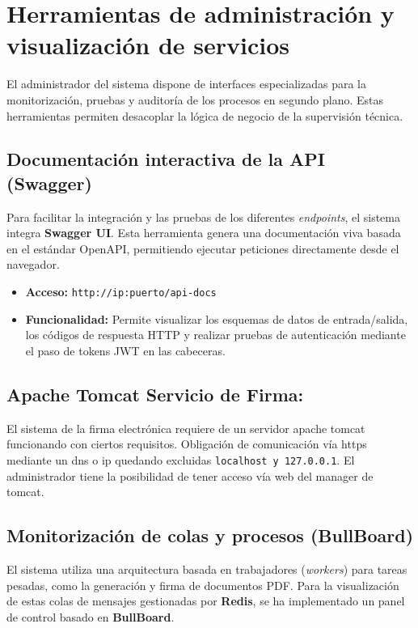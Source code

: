 \documentclass[12pt,a4paper]{report}
\begin{document}
\chapter{Herramientas de administración y visualización de servicios}

El administrador del sistema dispone de interfaces especializadas para la monitorización, pruebas y auditoría de los procesos en segundo plano. Estas herramientas permiten desacoplar la lógica de negocio de la supervisión técnica.

\section{Documentación interactiva de la API (Swagger)}

Para facilitar la integración y las pruebas de los diferentes \textit{endpoints}, el sistema integra \textbf{Swagger UI}. Esta herramienta genera una documentación viva basada en el estándar OpenAPI, permitiendo ejecutar peticiones directamente desde el navegador.

\begin{itemize}
    \item \textbf{Acceso:} \texttt{http://ip:puerto/api-docs}
    \item \textbf{Funcionalidad:} Permite visualizar los esquemas de datos de entrada/salida, los códigos de respuesta HTTP y realizar pruebas de autenticación mediante el paso de tokens JWT en las cabeceras.
\end{itemize}

\section{Apache Tomcat Servicio de Firma:}

El sistema de la firma electrónica requiere de un servidor apache tomcat funcionando con ciertos requisitos. Obligación de comunicación vía https mediante un dns o ip quedando excluidas \texttt{localhost y 127.0.0.1}. El administrador tiene la posibilidad de tener acceso vía web del manager de tomcat.



\section{Monitorización de colas y procesos (BullBoard)}

El sistema utiliza una arquitectura basada en trabajadores (\textit{workers}) para tareas pesadas, como la generación y firma de documentos PDF. Para la visualización de estas colas de mensajes gestionadas por \textbf{Redis}, se ha implementado un panel de control basado en \textbf{BullBoard}.
\end{document}
